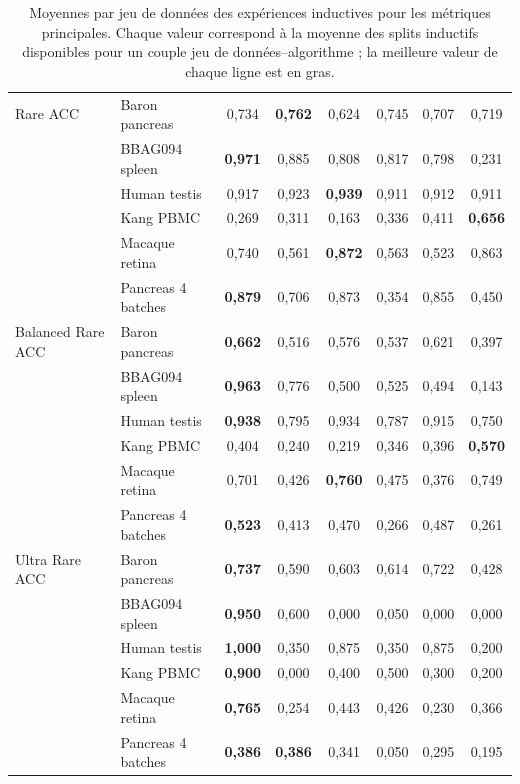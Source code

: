 \begin{table}[H]
{\begin{tabular}{l l c c c c c c}
\addlinespace[0.25em]
Rare ACC & Baron pancreas & 0,734 & \textbf{0,762} & 0,624 & 0,745 & 0,707 & 0,719 \\
 & BBAG094 spleen & \textbf{0,971} & 0,885 & 0,808 & 0,817 & 0,798 & 0,231 \\
 & Human testis & 0,917 & 0,923 & \textbf{0,939} & 0,911 & 0,912 & 0,911 \\
 & Kang PBMC & 0,269 & 0,311 & 0,163 & 0,336 & 0,411 & \textbf{0,656} \\
 & Macaque retina & 0,740 & 0,561 & \textbf{0,872} & 0,563 & 0,523 & 0,863 \\
 & Pancreas 4 batches & \textbf{0,879} & 0,706 & 0,873 & 0,354 & 0,855 & 0,450 \\
\addlinespace[0.25em]
Balanced Rare ACC & Baron pancreas & \textbf{0,662} & 0,516 & 0,576 & 0,537 & 0,621 & 0,397 \\
 & BBAG094 spleen & \textbf{0,963} & 0,776 & 0,500 & 0,525 & 0,494 & 0,143 \\
 & Human testis & \textbf{0,938} & 0,795 & 0,934 & 0,787 & 0,915 & 0,750 \\
 & Kang PBMC & 0,404 & 0,240 & 0,219 & 0,346 & 0,396 & \textbf{0,570} \\
 & Macaque retina & 0,701 & 0,426 & \textbf{0,760} & 0,475 & 0,376 & 0,749 \\
 & Pancreas 4 batches & \textbf{0,523} & 0,413 & 0,470 & 0,266 & 0,487 & 0,261 \\
\addlinespace[0.25em]
Ultra Rare ACC & Baron pancreas & \textbf{0,737} & 0,590 & 0,603 & 0,614 & 0,722 & 0,428 \\
 & BBAG094 spleen & \textbf{0,950} & 0,600 & 0,000 & 0,050 & 0,000 & 0,000 \\
 & Human testis & \textbf{1,000} & 0,350 & 0,875 & 0,350 & 0,875 & 0,200 \\
 & Kang PBMC & \textbf{0,900} & 0,000 & 0,400 & 0,500 & 0,300 & 0,200 \\
 & Macaque retina & \textbf{0,765} & 0,254 & 0,443 & 0,426 & 0,230 & 0,366 \\
 & Pancreas 4 batches & \textbf{0,386} & \textbf{0,386} & 0,341 & 0,050 & 0,295 & 0,195 \\
\bottomrule
\end{tabular}}
\caption[Scores détaillés de l'évaluation inductive]{Moyennes par jeu de données des expériences inductives pour les métriques principales. Chaque valeur correspond à la moyenne des splits inductifs disponibles pour un couple jeu de données--algorithme ; la meilleure valeur de chaque ligne est en gras.}
\label{tab:inductive_dataset_metric_values}
\end{table}
